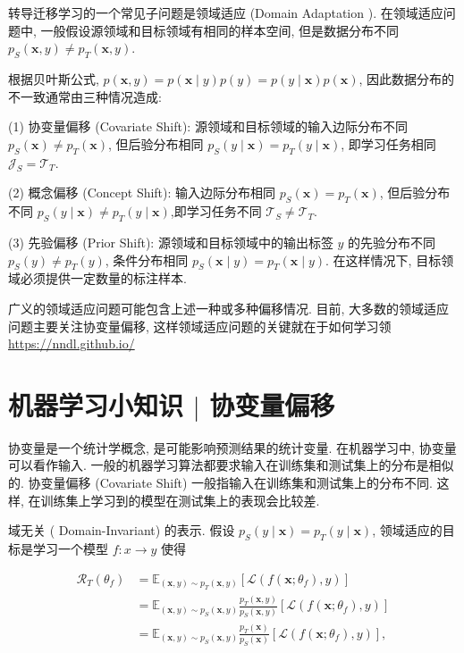 \documentclass[10pt]{article}
\begin{document}
转导迁移学习的一个常见子问题是领域适应 (Domain Adaptation ). 在领域适应问题中, 一般假设源领域和目标领域有相同的样本空间, 但是数据分布不同 $p_{S}(\boldsymbol{x}, y) \neq p_{T}(\boldsymbol{x}, y)$.

根据贝叶斯公式, $p(\boldsymbol{x}, y)=p(\boldsymbol{x} \mid y) p(y)=p(y \mid \boldsymbol{x}) p(\boldsymbol{x})$, 因此数据分布的不一致通常由三种情况造成:

(1) 协变量偏移 (Covariate Shift): 源领域和目标领域的输入边际分布不同 $p_{S}(\boldsymbol{x}) \neq p_{T}(\boldsymbol{x})$, 但后验分布相同 $p_{S}(y \mid \boldsymbol{x})=p_{T}(y \mid \boldsymbol{x})$, 即学习任务相同 $\mathcal{J}_{S}=\mathcal{T}_{T}$.

(2) 概念偏移 (Concept Shift): 输入边际分布相同 $p_{S}(\boldsymbol{x})=p_{T}(\boldsymbol{x})$, 但后验分布不同 $p_{S}(y \mid \boldsymbol{x}) \neq p_{T}(y \mid \boldsymbol{x})$,即学习任务不同 $\mathcal{T}_{S} \neq \mathcal{T}_{T}$.

(3) 先验偏移 (Prior Shift): 源领域和目标领域中的输出标签 $y$ 的先验分布不同 $p_{S}(y) \neq p_{T}(y)$, 条件分布相同 $p_{S}(\boldsymbol{x} \mid y)=p_{T}(\boldsymbol{x} \mid y)$. 在这样情况下, 目标领域必须提供一定数量的标注样本.

广义的领域适应问题可能包含上述一种或多种偏移情况. 目前, 大多数的领域适应问题主要关注协变量偏移, 这样领域适应问题的关键就在于如何学习领 \href{https://nndl.github.io/}{https://nndl.github.io/}

\section*{机器学习小知识 $\mid$ 协变量偏移}
协变量是一个统计学概念, 是可能影响预测结果的统计变量. 在机器学习中, 协变量可以看作输入. 一般的机器学习算法都要求输入在训练集和测试集上的分布是相似的. 协变量偏移 (Covariate Shift) 一般指输入在训练集和测试集上的分布不同. 这样, 在训练集上学习到的模型在测试集上的表现会比较差.



域无关 ( Domain-Invariant) 的表示. 假设 $p_{S}(y \mid \boldsymbol{x})=p_{T}(y \mid \boldsymbol{x})$, 领域适应的目标是学习一个模型 $f: x \rightarrow y$ 使得


\begin{align*}
\mathcal{R}_{T}\left(\theta_{f}\right) & =\mathbb{E}_{(\boldsymbol{x}, y) \sim p_{T}(\boldsymbol{x}, y)}\left[\mathcal{L}\left(f\left(\boldsymbol{x} ; \theta_{f}\right), y\right)\right]  \tag{10.26}\\
& =\mathbb{E}_{(\boldsymbol{x}, y) \sim p_{S}(\boldsymbol{x}, y)} \frac{p_{T}(\boldsymbol{x}, y)}{p_{S}(\boldsymbol{x}, y)}\left[\mathcal{L}\left(f\left(\boldsymbol{x} ; \theta_{f}\right), y\right)\right]  \tag{10.27}\\
& =\mathbb{E}_{(\boldsymbol{x}, y) \sim p_{S}(\boldsymbol{x}, y)} \frac{p_{T}(\boldsymbol{x})}{p_{S}(\boldsymbol{x})}\left[\mathcal{L}\left(f\left(\boldsymbol{x} ; \theta_{f}\right), y\right)\right], \tag{10.28}
\end{align*}
\end{document}
